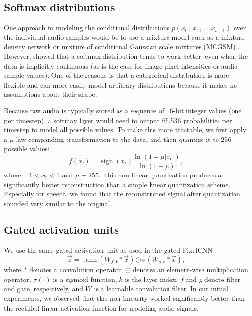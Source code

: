 \subsection{Softmax distributions}

One approach to modeling the conditional distributions $p\left(x_t \mid x_1, \dots ,x_{t-1}\right)$ over the individual audio samples would be to use a mixture model such as a mixture density network \citep{MDN} or mixture of conditional Gaussian scale mixtures (MCGSM) \citep{theis2015generative}.
However, \cite{van2016pixel} showed that a softmax distribution tends to work better, even when the data is implicitly continuous (as is the case for image pixel intensities or audio sample values). One of the reasons is that a categorical distribution is more flexible and can more easily model arbitrary distributions because it makes no assumptions about their shape.

Because raw audio is typically stored as a sequence of 16-bit integer values (one per timestep), a softmax layer would need to output 65,536 probabilities per timestep to model all possible values. To make this more tractable, we first apply a $\mu$-law companding transformation \citep{G711} to the data, and then quantize it to 256 possible values:
$$
f\left(x_t\right) = \operatorname{sign}(x_t) \frac{\ln \left(1+\mu \left| x_t \right|\right)}{\ln \left(1+\mu\right)},
$$
where $-1 < x_t < 1$ and $\mu = 255$. 
This non-linear quantization produces a significantly better reconstruction than a simple linear quantization scheme. Especially for speech, we found that the reconstructed signal after quantization sounded very similar to the original.

\subsection{Gated activation units}

We use the same gated activation unit as used in the gated PixelCNN \citep{ConditionalPixelCNN}:
\begin{equation}
\vec{z} = \tanh \left(W_{f, k} \ast \vec{x}\right) \odot \sigma \left(W_{g, k} \ast \vec{x} \right), \label{eq:gated_activation}
\end{equation}
where $\ast$ denotes a convolution operator, $\odot$ denotes an element-wise multiplication operator, $\sigma(\cdot)$ is a sigmoid function, $k$ is the layer index, $f$ and $g$ denote filter and gate, respectively, and $W$ is a learnable convolution filter.
In our initial experiments, we observed that this non-linearity worked significantly better than the rectified linear activation function \citep{nair2010rectified} for modeling audio signals.

